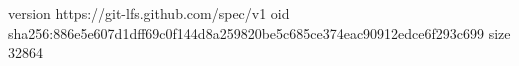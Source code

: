 version https://git-lfs.github.com/spec/v1
oid sha256:886e5e607d1dff69c0f144d8a259820be5c685ce374eac90912edce6f293c699
size 32864
